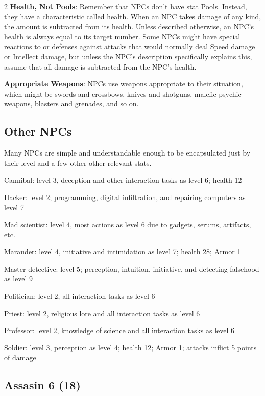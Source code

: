 \begin{multicols}{2}
\textbf{Health, Not Pools}: Remember that NPCs don’t have stat Pools. Instead, they have a characteristic called health. When an NPC takes damage of any kind, the amount is subtracted from its health. Unless described otherwise, an NPC’s health is always equal to its target number. Some NPCs might have special reactions to or defenses against attacks that would normally deal Speed damage or Intellect damage, but unless the NPC’s description specifically explains this, assume that all damage is subtracted from the NPC’s health.

\textbf{Appropriate Weapons}: NPCs use weapons appropriate to their situation, which might be swords and crossbows, knives and shotguns, malefic psychic weapons, blasters and grenades, and so on.

\subsection{Other NPCs}

Many NPCs are simple and understandable enough to be encapsulated just by their level and a few other other relevant stats.

Cannibal: level 3, deception and other interaction tasks as level 6; health 12

Hacker: level 2; programming, digital infiltration, and repairing computers as level 7

Mad scientist: level 4, most actions as level 6 due to gadgets, serums, artifacts, etc.

Marauder: level 4, initiative and intimidation as level 7; health 28; Armor 1

Master detective: level 5; perception, intuition, initiative, and detecting falsehood as level 9

Politician: level 2, all interaction tasks as level 6

Priest: level 2, religious lore and all interaction tasks as level 6

Professor: level 2, knowledge of science and all interaction tasks as level 6

Soldier: level 3, perception as level 4; health 12; Armor 1; attacks inflict 5 points of damage

\subsection{Assasin	6 (18)}


\end{multicols}
